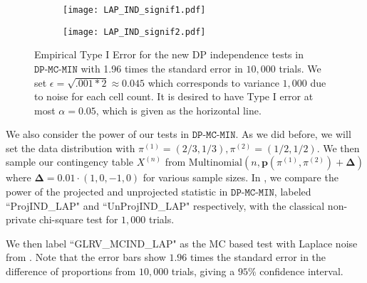 \documentclass[twoside,letterpaper]{article} \usepackage{aistats2017}
\theoremstyle{definition}
\theoremstyle{remark}
\begin{document}
\begin{figure}
\begin{center}
\begin{subfigure}{.45\textwidth}
\begin{flushleft}
\texttt{[image: LAP\_IND\_signif1.pdf]}
\end{flushleft}
\end{subfigure}
\begin{subfigure}{.1\textwidth}
\end{subfigure}
\hspace{10mm}
\begin{subfigure}{.45\textwidth}
\begin{flushright}
\texttt{[image: LAP\_IND\_signif2.pdf]}
\end{flushright}
\end{subfigure}
\caption{Empirical Type I Error for the new DP independence tests in $\texttt{DP-MC-MIN}$ with 1.96 times the standard error in $10,000$ trials.  We set $\epsilon = \sqrt{.001*2} \approx 0.045$ which corresponds to variance $1,000$ due to noise for each cell count.  It is desired to have Type I error at most $\alpha=0.05$, which is given as the horizontal line.  \label{fig:DP_IND_signif} }
\end{center}
\end{figure}

We also consider the power of our tests in $\texttt{DP-MC-MIN}$.   As we did before, we will set the data distribution with ${\pi^{({1})}} = (2/3,1/3), {\pi^{({2})}} = (1/2,1/2)$.  We then sample our contingency table ${X^{({n})}}$ from ${\mathrm{Multinomial}}(n,{\mathbf{p}}({\pi^{({1})}},{\pi^{({2})}})+ \pmb{\Delta})$ where $\pmb{\Delta} = 0.01 \cdot (1,0,-1,0)$ for various sample sizes.  In , we compare the power of the projected and unprojected statistic in $\texttt{DP-MC-MIN}$, labeled ``ProjIND\_LAP" and ``UnProjIND\_LAP" respectively, with the classical non-private chi-square test for $1,000$ trials.  

We then label ``GLRV\_MCIND\_LAP" as the MC based test with Laplace noise from \cite{GLRV16}.  Note that the error bars show $1.96$ times the standard error in the difference of proportions from $10,000$ trials, giving a $95\%$ confidence interval.
\end{document}
